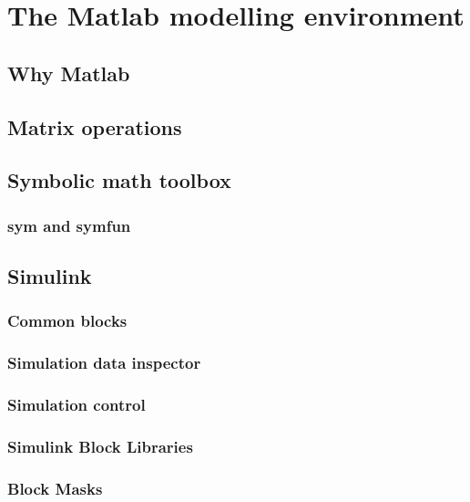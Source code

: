 \chapter{The Matlab modelling environment}
\label{chap:matlab}

\section{Why Matlab}
\label{sec:whyml}
\section{Matrix operations}
\label{sec:matrices}
\section{Symbolic math toolbox}
\label{sec:sym}
\subsection{sym and symfun}
\section{Simulink}
\label{sec:simulink}
\subsection{Common blocks}
\subsection{Simulation data inspector}
\subsection{Simulation control}
\subsection{Simulink Block Libraries}
\subsection{Block Masks}
